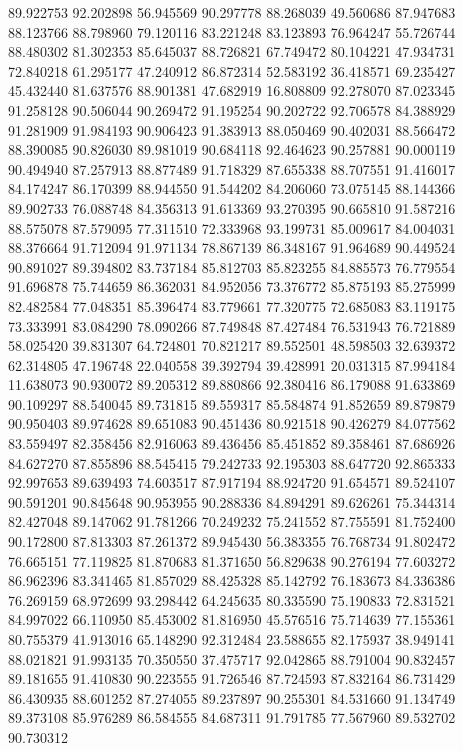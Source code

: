89.922753
92.202898
56.945569
90.297778
88.268039
49.560686
87.947683
88.123766
88.798960
79.120116
83.221248
83.123893
76.964247
55.726744
88.480302
81.302353
85.645037
88.726821
67.749472
80.104221
47.934731
72.840218
61.295177
47.240912
86.872314
52.583192
36.418571
69.235427
45.432440
81.637576
88.901381
47.682919
16.808809
92.278070
87.023345
91.258128
90.506044
90.269472
91.195254
90.202722
92.706578
84.388929
91.281909
91.984193
90.906423
91.383913
88.050469
90.402031
88.566472
88.390085
90.826030
89.981019
90.684118
92.464623
90.257881
90.000119
90.494940
87.257913
88.877489
91.718329
87.655338
88.707551
91.416017
84.174247
86.170399
88.944550
91.544202
84.206060
73.075145
88.144366
89.902733
76.088748
84.356313
91.613369
93.270395
90.665810
91.587216
88.575078
87.579095
77.311510
72.333968
93.199731
85.009617
84.004031
88.376664
91.712094
91.971134
78.867139
86.348167
91.964689
90.449524
90.891027
89.394802
83.737184
85.812703
85.823255
84.885573
76.779554
91.696878
75.744659
86.362031
84.952056
73.376772
85.875193
85.275999
82.482584
77.048351
85.396474
83.779661
77.320775
72.685083
83.119175
73.333991
83.084290
78.090266
87.749848
87.427484
76.531943
76.721889
58.025420
39.831307
64.724801
70.821217
89.552501
48.598503
32.639372
62.314805
47.196748
22.040558
39.392794
39.428991
20.031315
87.994184
11.638073
90.930072
89.205312
89.880866
92.380416
86.179088
91.633869
90.109297
88.540045
89.731815
89.559317
85.584874
91.852659
89.879879
90.950403
89.974628
89.651083
90.451436
80.921518
90.426279
84.077562
83.559497
82.358456
82.916063
89.436456
85.451852
89.358461
87.686926
84.627270
87.855896
88.545415
79.242733
92.195303
88.647720
92.865333
92.997653
89.639493
74.603517
87.917194
88.924720
91.654571
89.524107
90.591201
90.845648
90.953955
90.288336
84.894291
89.626261
75.344314
82.427048
89.147062
91.781266
70.249232
75.241552
87.755591
81.752400
90.172800
87.813303
87.261372
89.945430
56.383355
76.768734
91.802472
76.665151
77.119825
81.870683
81.371650
56.829638
90.276194
77.603272
86.962396
83.341465
81.857029
88.425328
85.142792
76.183673
84.336386
76.269159
68.972699
93.298442
64.245635
80.335590
75.190833
72.831521
84.997022
66.110950
85.453002
81.816950
45.576516
75.714639
77.155361
80.755379
41.913016
65.148290
92.312484
23.588655
82.175937
38.949141
88.021821
91.993135
70.350550
37.475717
92.042865
88.791004
90.832457
89.181655
91.410830
90.223555
91.726546
87.724593
87.832164
86.731429
86.430935
88.601252
87.274055
89.237897
90.255301
84.531660
91.134749
89.373108
85.976289
86.584555
84.687311
91.791785
77.567960
89.532702
90.730312
